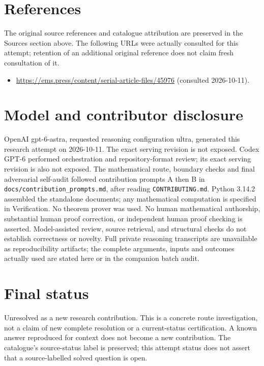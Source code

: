 \documentclass[11pt]{article}
\begin{document}
\section{References}
The original source references and catalogue attribution are preserved in the
Sources section above. The following URLs were actually consulted for this attempt;
retention of an additional original reference does not claim fresh consultation of it.
\begin{itemize}
\item \url{https://ems.press/content/serial-article-files/45976} (consulted 2026-10-11). 
\end{itemize}
\section{Model and contributor disclosure}
OpenAI gpt-6-astra, requested reasoning configuration ultra, generated this research
attempt on 2026-10-11. The exact serving revision is not exposed. Codex GPT-6
performed orchestration and repository-format review; its exact serving revision
is also not exposed. The mathematical route, boundary checks and final adversarial
self-audit followed contribution prompts A then B in
\texttt{docs/contribution\_prompts.md}, after reading \texttt{CONTRIBUTING.md}.
Python 3.14.2 assembled the standalone documents; any mathematical computation is
specified in Verification. No theorem prover was used. No human mathematical
authorship, substantial human proof correction, or independent human proof checking
is asserted. Model-assisted review, source retrieval, and structural checks do not
establish correctness or novelty. Full private reasoning transcripts are unavailable
as reproducibility artifacts; the complete arguments, inputs and outcomes actually
used are stated here or in the companion batch audit.
\section{Final status}
Unresolved as a new research contribution. This is a concrete route investigation,
not a claim of new complete resolution or a current-status certification. A known
answer reproduced for context does not become a new contribution. The catalogue's
source-status label is preserved; this attempt status does not assert that a
source-labelled solved question is open.
\end{document}
